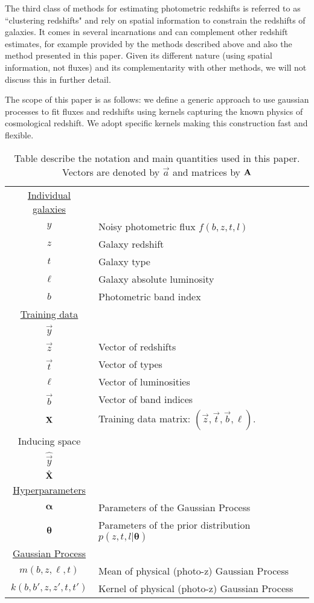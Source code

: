 \documentclass[aps,prd,showpacs,superscriptaddress,groupedaddress]{revtex4}  %
\begin{document}
The third class of methods for estimating photometric redshifts is referred to as ``clustering redshifts" and rely on spatial information to constrain the redshifts of galaxies.
It comes in several incarnations and can complement other redshift estimates, for example provided by the methods described above and also the method presented in this paper.
Given its different nature (using spatial information, not fluxes) and its complementarity with other methods, we will not discuss this in further detail.


The scope of this paper is as follows: we define a generic approach to use gaussian processes to fit fluxes and redshifts using kernels capturing the known physics of cosmological redshift.
We adopt specific kernels making this construction fast and flexible.


\begin{table}
\begin{tabular}{cll}
\hline
 \underline{Individual galaxies} \\
$y$ & Noisy photometric flux $f(b,z,t,l)$\\
$z$ & Galaxy redshift \\
$t$ & Galaxy type \\
$\ell$ & Galaxy absolute luminosity \\
$b$ & Photometric band index \\\hline
 \underline{Training data} \\ 
$\vec{y}$		&	\\
$\vec{z}$ & Vector of redshifts\\
$\vec{t}$ & Vector of types  \\
$\bm{\ell}$ & Vector of luminosities  \\
$\vec{b}$ & Vector of band indices  \\
$\mat{X}$ & Training data matrix: $(\vec{z},\vec{t},\vec{b},\bm{\ell})$. \\\hline
Inducing space\\\hline
$\hat{\vec{y}}$		&	\\
$\hat{\mat{X}}$\\\hline
 \underline{Hyperparameters}\\
$\bm{\alpha}$	& Parameters of the Gaussian Process\\
$\bm{\theta}$	& Parameters of the prior distribution $p(z,t,l|\bm{\theta})$ \\\hline
 \underline{Gaussian Process} \\
$m(b,z,\ell,t)$ 	& Mean of physical (photo-z) Gaussian Process \\
$k(b,b',z,z',t,t')$ & Kernel of physical (photo-z) Gaussian Process   \\\hline
\end{tabular}
\caption{Table describe the notation and main quantities used in this paper. Vectors are denoted by $\vec{a}$ and matrices by $\mat{A}$} 
\end{table}
\end{document}
